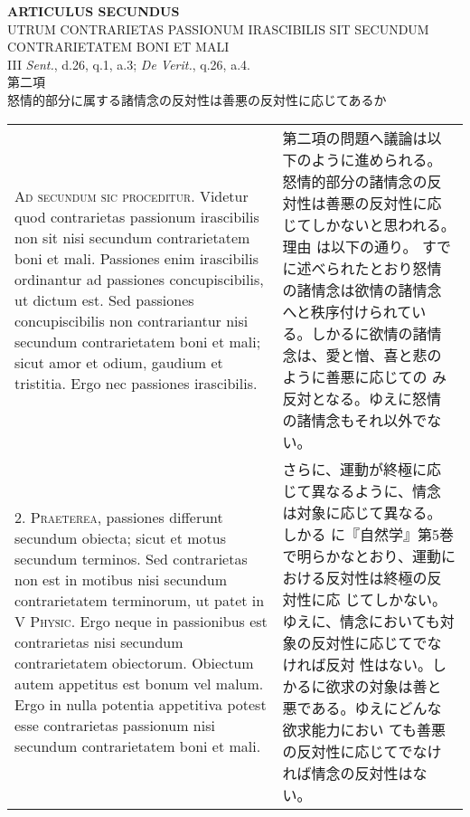 \documentclass[10pt]{jsarticle} %
\begin{document}
\begin{center}
{\Large {\bf ARTICULUS SECUNDUS}}\\
{\large UTRUM CONTRARIETAS PASSIONUM IRASCIBILIS SIT SECUNDUM
 CONTRARIETATEM BONI ET MALI}\\
{\footnotesize III {\itshape Sent.}, d.26, q.1, a.3; {\itshape De
 Verit.}, q.26, a.4.}\\
{\Large 第二項\\怒情的部分に属する諸情念の反対性は善悪の反対性に応じてあるか}
\end{center}

\begin{longtable}{p{21em}p{21em}}
{\scshape Ad secundum sic proceditur}. Videtur quod contrarietas passionum
irascibilis non sit nisi secundum contrarietatem boni et mali. Passiones
enim irascibilis ordinantur ad passiones concupiscibilis, ut dictum
est. Sed passiones concupiscibilis non contrariantur nisi secundum
contrarietatem boni et mali; sicut amor et odium, gaudium et
tristitia. Ergo nec passiones irascibilis.

&

第二項の問題へ議論は以下のように進められる。
怒情的部分の諸情念の反対性は善悪の反対性に応じてしかないと思われる。理由
 は以下の通り。
すでに述べられたとおり怒情の諸情念は欲情の諸情念へと秩序付けられてい
 る。しかるに欲情の諸情念は、愛と憎、喜と悲のように善悪に応じての
 み反対となる。ゆえに怒情の諸情念もそれ以外でない。

\\



2. {\scshape Praeterea}, passiones differunt secundum obiecta; sicut et motus secundum
terminos. Sed contrarietas non est in motibus nisi secundum
contrarietatem terminorum, ut patet in V {\scshape Physic}. Ergo neque in
passionibus est contrarietas nisi secundum contrarietatem
obiectorum. Obiectum autem appetitus est bonum vel malum. Ergo in nulla
potentia appetitiva potest esse contrarietas passionum nisi secundum
contrarietatem boni et mali.


&

さらに、運動が終極に応じて異なるように、情念は対象に応じて異なる。しかる
 に『自然学』第5巻で明らかなとおり、運動における反対性は終極の反対性に応
 じてしかない。ゆえに、情念においても対象の反対性に応じてでなければ反対
 性はない。しかるに欲求の対象は善と悪である。ゆえにどんな欲求能力におい
 ても善悪の反対性に応じてでなければ情念の反対性はない。


\\




\end{longtable}
\end{document}
